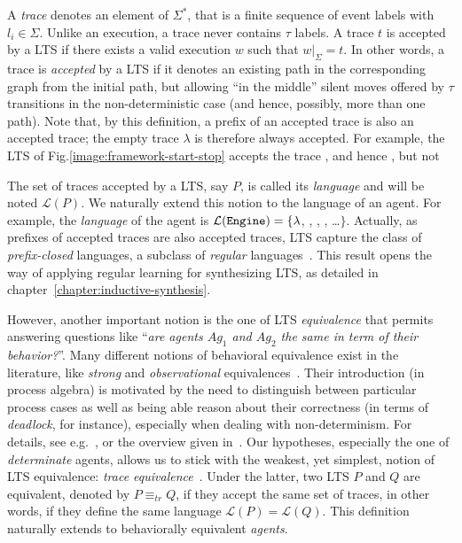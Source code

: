 A \emph{trace} denotes an element of $\Sigma^*$, that is a finite sequence of event labels  with $l_i \in \Sigma$. Unlike an execution, a trace never contains $\tau$ labels. A trace $t$ is accepted by a LTS if there exists a valid execution $w$ such that $w|_{\Sigma} = t$. In other words, a trace is \emph{accepted} by a LTS if it denotes an existing path in the corresponding graph from the initial path, but allowing ``in the middle'' silent moves offered by $\tau$ transitions in the non-deterministic case (and hence, possibly, more than one path). Note that, by this definition, a prefix of an accepted trace is also an accepted trace; the empty trace $\lambda$ is therefore always accepted. For example, the LTS of Fig.\ref{image:framework-start-stop} accepts the trace , and hence , but not 

The set of traces accepted by a LTS, say $P$, is called its \emph{language} and will be noted $\mathcal{L}(P)$. We naturally extend this notion to the language of an agent. For example, the  \emph{language} of the  agent is $\mathcal{L}(\texttt{Engine})=\{\lambda$, , , , \ldots $\}$. Actually, as prefixes of accepted traces are also accepted traces, LTS capture the class of \emph{prefix-closed} languages, a subclass of \emph{regular} languages~\cite{Hopcroft:1979}. This result opens the way of applying regular learning for synthesizing LTS, as detailed in chapter~\ref{chapter:inductive-synthesis}.

However, another important notion is the one of LTS \emph{equivalence} that permits answering questions like ``\emph{are agents $Ag_1$ and $Ag_2$ the same in term of their behavior?}''. Many different notions of behavioral equivalence exist in the literature, like \emph{strong} and \emph{observational}  equivalences~\cite{Milner:1989}. Their introduction (in process algebra) is motivated by the need to distinguish between particular process cases as well as being able reason about their correctness (in terms of \emph{deadlock}, for instance), especially when dealing with non-determinism. For details, see e.g.~\cite[chap. 3]{Hoare:1985}, \cite[chap. 4 \& 5]{Milner:1989} or the overview given in~\cite{Fernandez:1991}. Our hypotheses, especially the one of \emph{determinate} agents, allows us to stick with the weakest, yet simplest, notion of LTS equivalence: \emph{trace equivalence}~\cite{Hoare:1985, Engelfriet:1985}. Under the latter, two LTS $P$ and $Q$ are equivalent, denoted by $P \equiv_{tr} Q$, if they accept the same set of traces, in other words, if they define the same language $\mathcal{L}(P) = \mathcal{L}(Q)$. This definition naturally extends to behaviorally equivalent \emph{agents}.

